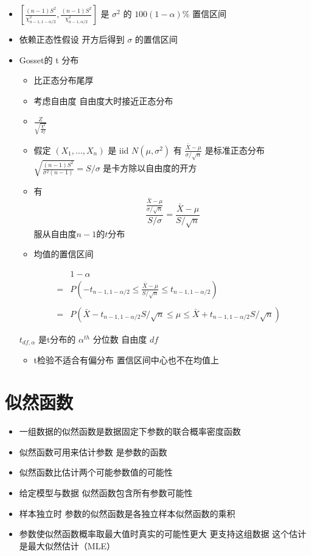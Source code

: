 \documentclass[]{book}
\providecommand{\tightlist}{%
  \setlength{\itemsep}{0pt}\setlength{\parskip}{0pt}}
\begin{document}
\begin{itemize}
\tightlist
\item
  \(\left[\frac{(n-1)S^2}{\chi^2_{n-1,1-\alpha/2}}, \frac{(n-1)S^2}{\chi^2_{n-1,\alpha/2}}\right]\) 是 \(\sigma^2\) 的 \(100(1-\alpha)\%\) 置信区间
\item
  依赖正态性假设 开方后得到 \(\sigma\) 的置信区间
\item
  Gosset的 t 分布

  \begin{itemize}
  \tightlist
  \item
    比正态分布尾厚
  \item
    考虑自由度 自由度大时接近正态分布
  \item
    \(\frac{Z}{\sqrt{\frac{\chi^2}{df}}}\)
  \item
    假定 \((X_1,\ldots,X_n)\) 是 iid \(N(\mu,\sigma^2)\) 有 \(\frac{\bar X - \mu}{\sigma / \sqrt{n}}\) 是标准正态分布 \(\sqrt{\frac{(n - 1) S^2}{\sigma^2 (n - 1)}} = S / \sigma\) 是卡方除以自由度的开方
  \item
    有
    \[
    \frac{\frac{\bar X - \mu}{\sigma /\sqrt{n}}}{S/\sigma}  
    = \frac{\bar X - \mu}{S/\sqrt{n}}
    \]
    服从自由度\(n-1\)的\(t\)分布
  \item
    均值的置信区间
  \end{itemize}

  \begin{eqnarray*}
  &   & 1 - \alpha \\
  & = & P\left(-t_{n-1,1-\alpha/2} \leq \frac{\bar X - \mu}{S/\sqrt{n}} \leq t_{n-1,1-\alpha/2}\right) \\ \\
  & = & P\left(\bar X - t_{n-1,1-\alpha/2} S / \sqrt{n} \leq \mu  
      \leq \bar X + t_{n-1,1-\alpha/2}S /\sqrt{n}\right)
  \end{eqnarray*}

  \(t_{df,\alpha}\) 是t分布的 \(\alpha^{th}\) 分位数 自由度 \(df\)

  \begin{itemize}
  \tightlist
  \item
    t检验不适合有偏分布 置信区间中心也不在均值上
  \end{itemize}
\end{itemize}

\section{似然函数}

\begin{itemize}
\tightlist
\item
  一组数据的似然函数是数据固定下参数的联合概率密度函数
\item
  似然函数可用来估计参数 是参数的函数
\item
  似然函数比估计两个可能参数值的可能性
\item
  给定模型与数据 似然函数包含所有参数可能性
\item
  样本独立时 参数的似然函数是各独立样本似然函数的乘积
\item
  参数使似然函数概率取最大值时真实的可能性更大 更支持这组数据 这个估计是最大似然估计（MLE）
\end{itemize}
\end{document}
